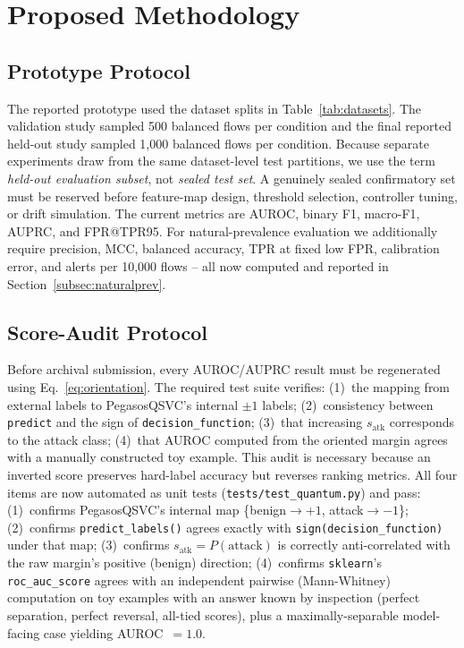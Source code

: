 \documentclass[conference]{IEEEtran}
\begin{document}
\section{Proposed Methodology}
\label{sec:proposed}

\subsection{Prototype Protocol}

The reported prototype used the dataset splits in Table~\ref{tab:datasets}.
The validation study sampled 500 balanced flows per condition and the
final reported held-out study sampled 1,000 balanced flows per condition.
Because separate experiments draw from the same dataset-level test
partitions, we use the term \emph{held-out evaluation subset}, not
\emph{sealed test set}. A genuinely sealed confirmatory set must be
reserved before feature-map design, threshold selection, controller
tuning, or drift simulation. The current metrics are AUROC, binary F1,
macro-F1, AUPRC, and FPR@TPR95. For natural-prevalence evaluation we
additionally require precision, MCC, balanced accuracy, TPR at fixed low
FPR, calibration error, and alerts per 10,000 flows -- all now computed
and reported in Section~\ref{subsec:naturalprev}.

\subsection{Score-Audit Protocol}
\label{subsec:audit_status}

Before archival submission, every AUROC/AUPRC result must be regenerated
using Eq.~\eqref{eq:orientation}. The required test suite verifies: (1)~the
mapping from external labels to PegasosQSVC's internal $\pm1$ labels;
(2)~consistency between \texttt{predict} and the sign of
\texttt{decision\_function}; (3)~that increasing $s_{\text{atk}}$
corresponds to the attack class; (4)~that AUROC computed from the
oriented margin agrees with a manually constructed toy example. This
audit is necessary because an inverted score preserves hard-label
accuracy but reverses ranking metrics. All four items are now automated
as unit tests (\texttt{tests/test\_quantum.py}) and pass: (1)~confirms
PegasosQSVC's internal map \{benign$\to+1$, attack$\to-1$\}; (2)~confirms
\texttt{predict\_labels()} agrees exactly with
\texttt{sign(decision\_function)} under that map; (3)~confirms
$s_{\text{atk}}=P(\text{attack})$ is correctly anti-correlated with the
raw margin's positive (benign) direction; (4)~confirms
\texttt{sklearn}'s \texttt{roc\_auc\_score} agrees with an independent
pairwise (Mann-Whitney) computation on toy examples with an answer known
by inspection (perfect separation, perfect reversal, all-tied scores),
plus a maximally-separable model-facing case yielding AUROC~$=1.0$.
\end{document}
